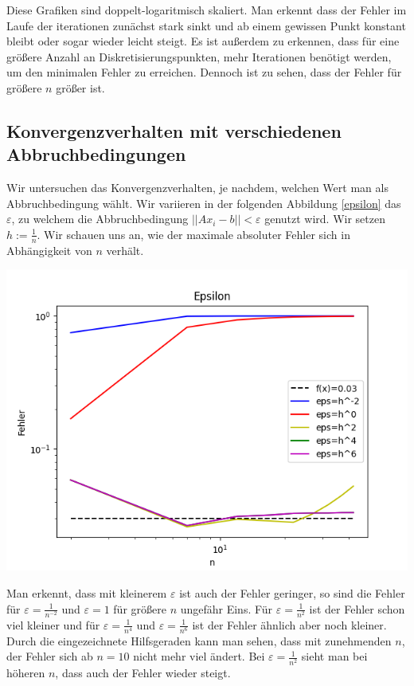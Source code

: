 \documentclass[smallheadings]{scrartcl}
\theoremstyle{definition}
\begin{document}
 Diese Grafiken sind doppelt-logaritmisch skaliert.  Man erkennt dass der Fehler im Laufe der iterationen zunächst stark sinkt und ab einem gewissen Punkt konstant bleibt oder sogar wieder leicht steigt.  Es ist außerdem zu erkennen, dass für eine größere Anzahl an Diskretisierungspunkten, mehr Iterationen benötigt werden, um den minimalen Fehler zu erreichen. Dennoch ist zu sehen, dass der Fehler für größere $n$ größer ist. 


\subsection{Konvergenzverhalten mit verschiedenen Abbruchbedingungen}
Wir untersuchen das Konvergenzverhalten, je nachdem, welchen Wert man als Abbruchbedingung wählt.  Wir variieren in der folgenden Abbildung \ref{epsilon} das $\varepsilon$,  zu welchem die Abbruchbedingung $||Ax_i -b||<\varepsilon$ genutzt wird. Wir setzen $h:=\frac{1}{n}$. Wir schauen uns an, wie der maximale absoluter Fehler sich in Abhängigkeit von $n$ verhält. 


\begin{minipage}{\textwidth}

 \centering
 \includegraphics[scale = 0.9]{epsilon1}
 	\label{epsilon}

 \end{minipage}
 
 Man erkennt, dass mit kleinerem $\varepsilon$ ist auch der Fehler geringer, so sind die Fehler für $\varepsilon =\frac{1}{n^{-2}}$ und $\varepsilon =1$ für größere $n$ ungefähr Eins.    Für $\varepsilon =\frac{1}{n^{2}}$ ist der Fehler schon viel kleiner und für  $\varepsilon =\frac{1}{n^{4}}$ und  $\varepsilon =\frac{1}{n^{6}}$ ist der Fehler ähnlich aber noch kleiner.  Durch die eingezeichnete Hilfsgeraden kann man sehen, dass mit zunehmenden $n$, der Fehler sich ab $n=10$ nicht mehr viel ändert.  Bei $\varepsilon = \frac{1}{n^{2}}$ sieht man bei höheren $n$, dass auch der Fehler wieder steigt.
\end{document}

